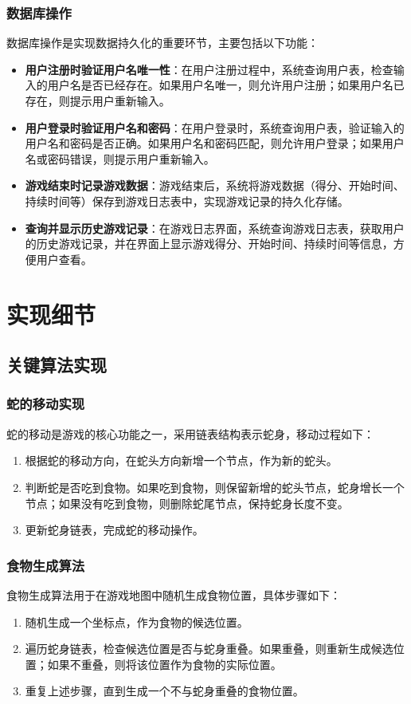 \documentclass{article}
\begin{document}
\subsubsection{数据库操作}
数据库操作是实现数据持久化的重要环节，主要包括以下功能：
\begin{itemize}
    \item \textbf{用户注册时验证用户名唯一性}：在用户注册过程中，系统查询用户表，检查输入的用户名是否已经存在。如果用户名唯一，则允许用户注册；如果用户名已存在，则提示用户重新输入。
    \item \textbf{用户登录时验证用户名和密码}：在用户登录时，系统查询用户表，验证输入的用户名和密码是否正确。如果用户名和密码匹配，则允许用户登录；如果用户名或密码错误，则提示用户重新输入。
    \item \textbf{游戏结束时记录游戏数据}：游戏结束后，系统将游戏数据（得分、开始时间、持续时间等）保存到游戏日志表中，实现游戏记录的持久化存储。
    \item \textbf{查询并显示历史游戏记录}：在游戏日志界面，系统查询游戏日志表，获取用户的历史游戏记录，并在界面上显示游戏得分、开始时间、持续时间等信息，方便用户查看。
\end{itemize}

\section{实现细节}

\subsection{关键算法实现}

\subsubsection{蛇的移动实现}
蛇的移动是游戏的核心功能之一，采用链表结构表示蛇身，移动过程如下：
\begin{enumerate}
    \item 根据蛇的移动方向，在蛇头方向新增一个节点，作为新的蛇头。
    \item 判断蛇是否吃到食物。如果吃到食物，则保留新增的蛇头节点，蛇身增长一个节点；如果没有吃到食物，则删除蛇尾节点，保持蛇身长度不变。
    \item 更新蛇身链表，完成蛇的移动操作。
\end{enumerate}

\subsubsection{食物生成算法}
食物生成算法用于在游戏地图中随机生成食物位置，具体步骤如下：
\begin{enumerate}
    \item 随机生成一个坐标点，作为食物的候选位置。
    \item 遍历蛇身链表，检查候选位置是否与蛇身重叠。如果重叠，则重新生成候选位置；如果不重叠，则将该位置作为食物的实际位置。
    \item 重复上述步骤，直到生成一个不与蛇身重叠的食物位置。
\end{enumerate}
\end{document}
